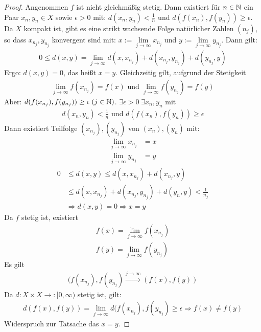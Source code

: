 \begin{proof}
	Angenommen $f$ ist nicht gleichmäßig stetig. Dann existiert für $n \in \mathbb{N}$ ein 
	Paar $x_n,y_n \in X$ sowie $\epsilon > 0$ mit: $d(x_n,y_n) < \frac{1}{n}$ und 
	$d(f(x_n),f(y_n)) \geq \epsilon$.\\
	Da $X$ kompakt ist, gibt es eine strikt wachsende Folge natürlicher Zahlen 
	$(n_j)$, so dass $x_{n_j},y_{n_j}$ konvergent sind mit: $x:= \lim\limits_{j 
	\rightarrow \infty}{x_{n_j}}$ und $y := \lim\limits_{j \rightarrow \infty}{
	y_{n_j}}$. Dann gilt:
	\begin{align*}
		0 \leq d(x,y) = \lim\limits_{j\rightarrow \infty}{d(x,x_{n_j}) + 
		d(x_{n_j},y_{n_j}) + d(y_{n_j}, y)}
	\end{align*}
	Ergo: $d(x,y) = 0$, das heißt $x =y$.
	Gleichzeitig gilt, aufgrund der Stetigkeit 
	\begin{align*}
		\lim\limits_{j \rightarrow \infty}{f(x_{n_j})} = f(x) \text{ und } 
		\lim\limits_{j \rightarrow \infty}{f(y_{n_j})} = f(y) 
	\end{align*}
	Aber: $d(f(x_{n_j}),f(y_{n_j})) \geq \epsilon \; (j \in \mathbb{N})$.
	$\exists \epsilon > 0 \; \exists x_n, y_n$ mit 
	\begin{align*}
		d(x_n,y_n) < \frac{1}{n} \text{ und } d(f(x_n),f(y_n)) \geq \epsilon
	\end{align*}
	Dann existiert Teilfolge $(x_{n_j}),(y_{n_j})$ von $(x_n),(y_n)$ mit:
	\begin{align*}
		\lim\limits_{j\rightarrow\infty}{x_{n_j}} & = x \\
		\lim\limits_{j\rightarrow \infty}{y_{n_j}} & = y
	\end{align*}
	\begin{align*}
		0 & \leq d(x,y) \leq d(x,x_{n_j}) + d(x_{n_j},y) \\
			&\leq d(x,x_{n_j}) + d(x_{n_j},y_{n_j}) + d(y_n,y) < \frac{1}{n_j} \\
		& \Rightarrow d(x,y) = 0 \Rightarrow x = y
	\end{align*}
	Da $f$ stetig ist, existiert 
	\begin{align*}
		f(x) = \lim\limits_{j \rightarrow \infty}{f(x_{n_j})}\\
		f(y) = \lim\limits_{j \rightarrow \infty}{f(y_{n_j})}
	\end{align*}
	Es gilt
	\begin{align*}
		(f(x_{n_j}),f(y_{n_j}) \xrightarrow{j \rightarrow \infty} (f(x),f(y))
	\end{align*}
	Da $d:X \times X \rightarrow :[0, \infty)$ stetig ist, gilt:
	\begin{align*}
		d(f(x),f(y)) = \lim\limits_{j\rightarrow \infty}{d(f(x_{n_j}),f(y_{n_j})}
		\geq \epsilon \Rightarrow f(x) \neq f(y) 
	\end{align*}
	Widerspruch zur Tatsache das $x=y$.
\end{proof}

